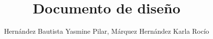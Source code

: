 \documentclass[11pt,letterpaper]{book}
\begin{document}
	\author{Hernández Bautista Yasmine Pilar, Márquez 		Hernández Karla Rocío}
	\title{Documento de diseño}
	\maketitle
	\frontmatter
	\tableofcontents
	
	\mainmatter
	
	
	
	
	
	
	
	
	
	
	
 	
	
	
	
	
	
	
	
	
	

\printglossary
\end{document}

